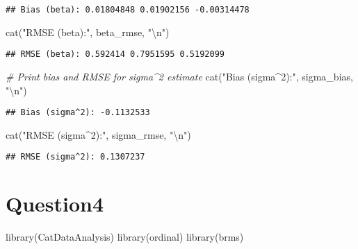\documentclass[
]{article}
\newenvironment{Shaded}{\begin{snugshade}}{\end{snugshade}}
\newcommand{\CommentTok}[1]{\textcolor[rgb]{0.56,0.35,0.01}{\textit{#1}}}
\newcommand{\FunctionTok}[1]{\textcolor[rgb]{0.00,0.00,0.00}{#1}}
\newcommand{\NormalTok}[1]{#1}
\newcommand{\SpecialCharTok}[1]{\textcolor[rgb]{0.00,0.00,0.00}{#1}}
\newcommand{\StringTok}[1]{\textcolor[rgb]{0.31,0.60,0.02}{#1}}
\begin{document}
\begin{verbatim}
## Bias (beta): 0.01804848 0.01902156 -0.00314478
\end{verbatim}

\begin{Shaded}
\begin{Highlighting}[]
\FunctionTok{cat}\NormalTok{(}\StringTok{"RMSE (beta):"}\NormalTok{, beta\_rmse, }\StringTok{"}\SpecialCharTok{\textbackslash{}n}\StringTok{"}\NormalTok{)}
\end{Highlighting}
\end{Shaded}

\begin{verbatim}
## RMSE (beta): 0.592414 0.7951595 0.5192099
\end{verbatim}

\begin{Shaded}
\begin{Highlighting}[]
\CommentTok{\# Print bias and RMSE for sigma\^{}2 estimate}
\FunctionTok{cat}\NormalTok{(}\StringTok{"Bias (sigma\^{}2):"}\NormalTok{, sigma\_bias, }\StringTok{"}\SpecialCharTok{\textbackslash{}n}\StringTok{"}\NormalTok{)}
\end{Highlighting}
\end{Shaded}

\begin{verbatim}
## Bias (sigma^2): -0.1132533
\end{verbatim}

\begin{Shaded}
\begin{Highlighting}[]
\FunctionTok{cat}\NormalTok{(}\StringTok{"RMSE (sigma\^{}2):"}\NormalTok{, sigma\_rmse, }\StringTok{"}\SpecialCharTok{\textbackslash{}n}\StringTok{"}\NormalTok{)}
\end{Highlighting}
\end{Shaded}

\begin{verbatim}
## RMSE (sigma^2): 0.1307237
\end{verbatim}

\hypertarget{question4}{%
\section{Question4}\label{question4}}

\begin{Shaded}
\begin{Highlighting}[]
\FunctionTok{library}\NormalTok{(CatDataAnalysis)}
\FunctionTok{library}\NormalTok{(ordinal)}
\FunctionTok{library}\NormalTok{(brms)}
\end{Highlighting}
\end{Shaded}
\end{document}
